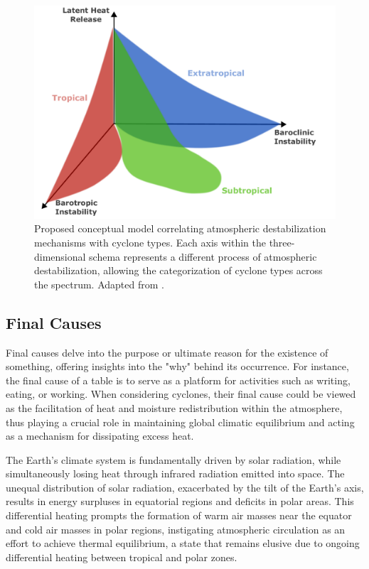 \begin{figure}[h!]
\begin{center}
\setcaptionmargin{1cm}
\includegraphics[width=0.9\columnwidth,angle=0]{fig/instabilities_cyclones_types.pdf}
\caption[Conceptual Model: Instabilities and Types of Cyclones]{Proposed conceptual model correlating atmospheric destabilization mechanisms with cyclone types. Each axis within the three-dimensional schema represents a different process of atmospheric destabilization, allowing the categorization of cyclone types across the spectrum. Adapted from \citet{silva_dias_catarina_2004}.}
\label{concecputal_view_instabilities}
\end{center}
\end{figure}

\subsection{Final Causes}\label{final_causes}

Final causes delve into the purpose or ultimate reason for the existence of something, offering insights into the "why" behind its occurrence. For instance, the final cause of a table is to serve as a platform for activities such as writing, eating, or working. When considering cyclones, their final cause could be viewed as the facilitation of heat and moisture redistribution within the atmosphere, thus playing a crucial role in maintaining global climatic equilibrium and acting as a mechanism for dissipating excess heat.

The Earth's climate system is fundamentally driven by solar radiation, while simultaneously losing heat through infrared radiation emitted into space. The unequal distribution of solar radiation, exacerbated by the tilt of the Earth's axis, results in energy surpluses in equatorial regions and deficits in polar areas. This differential heating prompts the formation of warm air masses near the equator and cold air masses in polar regions, instigating atmospheric circulation as an effort to achieve thermal equilibrium, a state that remains elusive due to ongoing differential heating between tropical and polar zones.

